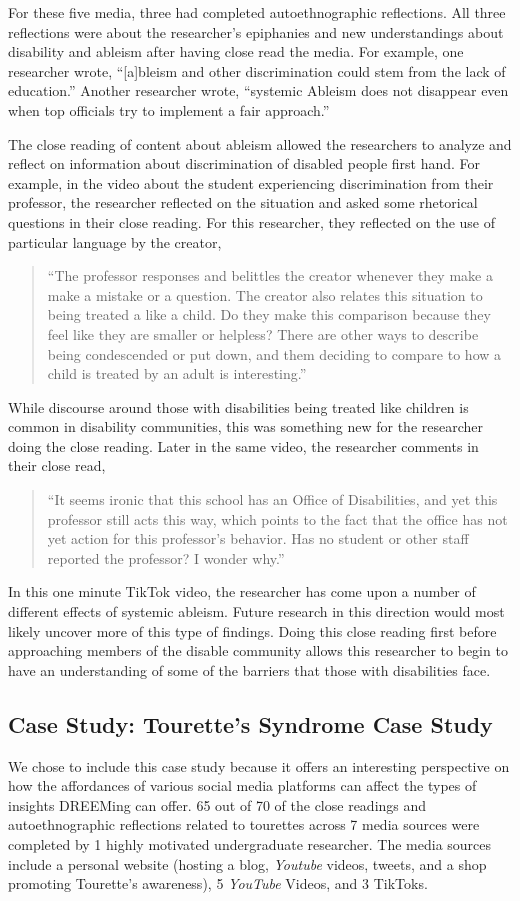 For these five media, three had completed autoethnographic reflections. All three reflections were about the researcher's epiphanies and new understandings about disability and ableism after having close read the media. For example, one researcher wrote, ``[a]bleism and other discrimination could stem from the lack of education.'' Another researcher wrote, ``systemic Ableism does not disappear even when top officials try to implement a fair approach.''

The close reading of content about ableism allowed the researchers to analyze and reflect on information about discrimination of disabled people first hand. For example, in the video about the student experiencing discrimination from their professor, the researcher reflected on the situation and asked some rhetorical questions in their close reading. For this researcher, they reflected on the use of particular language by the creator,
\begin{quote}
    ``The professor responses and belittles the creator whenever they make a make a mistake or a question. The creator also relates this situation to being treated a like a child. Do they make this comparison because they feel like they are smaller or helpless? There are other ways to describe being condescended or put down, and them deciding to compare to how a child is treated by an adult is interesting.''
\end{quote}
While discourse around those with disabilities being treated like children is common in disability communities, this was something new for the researcher doing the close reading. Later in the same video, the researcher comments in their close read, 
\begin{quote}
    ``It seems ironic that this school has an Office of Disabilities, and yet this professor still acts this way, which points to the fact that the office has not yet action for this professor's behavior. Has no student or other staff reported the professor? I wonder why.''
\end{quote}
In this one minute TikTok video, the researcher has come upon a number of different effects of systemic ableism. Future research in this direction would most likely uncover more of this type of findings. Doing this close reading first before approaching members of the disable community allows this researcher to begin to have an understanding of some of the barriers that those with disabilities face.


\subsection{Case Study: Tourette's Syndrome Case Study}
We chose to include this case study because it offers an interesting perspective on how the affordances of various social media platforms can affect the types of insights DREEMing can offer. 65 out of 70 of the close readings and autoethnographic reflections related to tourettes across 7 media sources were completed by 1 highly motivated undergraduate researcher. The media sources include a personal website (hosting a blog, \textit{Youtube} videos, tweets, and a shop promoting Tourette's awareness), 5 \textit{YouTube} Videos, and 3 TikToks. 

